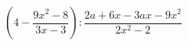 \begin{ex}[type=expression]
	\begin{condition}
		\( \left( 4-\dfrac{9x^2-8}{3x-3} \right):\dfrac{2a+6x-3ax-9x^2}{2x^2-2} \)
	\end{condition}
\end{ex}